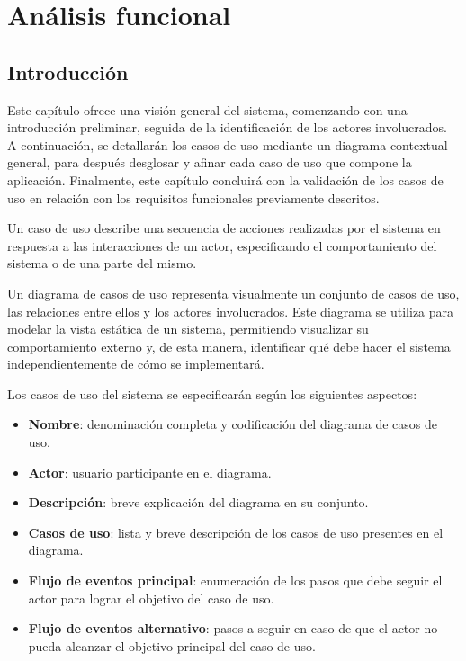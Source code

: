 \chapter{Análisis funcional} \label{cap:analisis}

\section{Introducción}

Este capítulo ofrece una visión general del sistema, comenzando con una introducción preliminar, seguida de la identificación de los actores involucrados. A continuación, se detallarán los casos de uso mediante un diagrama contextual general, para después desglosar y afinar cada caso de uso que compone la aplicación. Finalmente, este capítulo concluirá con la validación de los casos de uso en relación con los requisitos funcionales previamente descritos.

Un caso de uso describe una secuencia de acciones realizadas por el sistema en respuesta a las interacciones de un actor, especificando el comportamiento del sistema o de una parte del mismo.

Un diagrama de casos de uso representa visualmente un conjunto de casos de uso, las relaciones entre ellos y los actores involucrados. Este diagrama se utiliza para modelar la vista estática de un sistema, permitiendo visualizar su comportamiento externo y, de esta manera, identificar qué debe hacer el sistema independientemente de cómo se implementará.

Los casos de uso del sistema se especificarán según los siguientes aspectos:

\begin{itemize}
    \item \textbf{Nombre}: denominación completa y codificación del diagrama de casos de uso.
    \item \textbf{Actor}: usuario participante en el diagrama.
    \item \textbf{Descripción}: breve explicación del diagrama en su conjunto.
    \item \textbf{Casos de uso}: lista y breve descripción de los casos de uso presentes en el diagrama.
    \item \textbf{Flujo de eventos principal}: enumeración de los pasos que debe seguir el actor para lograr el objetivo del caso de uso.
    \item \textbf{Flujo de eventos alternativo}: pasos a seguir en caso de que el actor no pueda alcanzar el objetivo principal del caso de uso.
\end{itemize}

